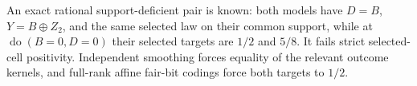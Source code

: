 An exact rational support-deficient pair is known: both models have \(D=B\), \(Y=B\oplus Z_2\), and the same selected law on their common support, while at \(\operatorname{do}(B=0,D=0)\) their selected targets are \(1/2\) and \(5/8\). It fails strict selected-cell positivity. Independent smoothing forces equality of the relevant outcome kernels, and full-rank affine fair-bit codings force both targets to \(1/2\).